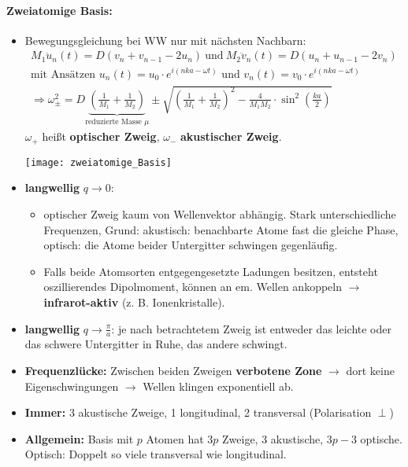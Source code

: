 \documentclass[a4paper,12pt]{article}
\begin{document}
\paragraph*{Zweiatomige Basis:}
\begin{itemize}
	\item Bewegungsgleichung bei WW nur mit nächsten Nachbarn: \begin{align*}
	M_1 \ddot{u}_n (t) = D (v_n + v_{n-1} - 2 u_n) ~\mathrm{ und }~ M_2 \ddot{v}_n (t) = D \left(u_n + u_{n-1} - 2 v_n\right)\\
	\text{mit Ansätzen } u_n(t) = u_0 \cdot e^{i(nka-\omega t)} \text{ und } v_n(t) = v_0 \cdot e^{i(nka-\omega t)}\\
	 \Rightarrow \omega^2_{\pm} = D \underbrace{\left(\frac{1}{M_1} + \frac{1}{M_2}\right)}_{\text{reduzierte Masse }\mu} \pm \sqrt{\left(\frac{1}{M_1} + \frac{1}{M_2}\right)^2 - \frac{4}{M_1M_2}\cdot \sin^2 \left(\frac{ka}{2}\right)} 
	\end{align*}
	$ \omega_+ $ heißt \textbf{optischer Zweig}, $ \omega_- $ \textbf{akustischer Zweig}.
	\begin{center}
		\texttt{[image: zweiatomige\_Basis]}
	\end{center}
	\item \textbf{langwellig} $ q\rightarrow 0 $:\begin{itemize}
		\item optischer Zweig kaum von Wellenvektor abhängig. Stark unterschiedliche Frequenzen, Grund: akustisch: benachbarte Atome fast die gleiche Phase, optisch: die Atome beider Untergitter schwingen gegenläufig.
		\item Falls beide Atomsorten entgegengesetzte Ladungen besitzen, entsteht oszillierendes Dipolmoment, können an em. Wellen ankoppeln $ \rightarrow $ \textbf{infrarot-aktiv} (z. B. Ionenkristalle).
	\end{itemize} 
	\item \textbf{langwellig} $ q \rightarrow \frac{\pi}{a} $:  je nach betrachtetem Zweig ist entweder das leichte oder das schwere Untergitter in Ruhe, das andere schwingt.
	\item \textbf{Frequenzlücke:} Zwischen beiden Zweigen \textbf{verbotene Zone} $ \rightarrow $ dort keine Eigenschwingungen $ \rightarrow $ Wellen klingen exponentiell ab.
	\item \textbf{Immer:} 3 akustische Zweige, 1 longitudinal, 2 transversal (Polarisation $ \perp $)
	\item \textbf{Allgemein:} Basis mit $ p $ Atomen hat $ 3p $ Zweige, 3 akustische, $ 3p-3 $ optische. Optisch: Doppelt so viele transversal wie longitudinal.
	\end{itemize}
\end{document}
